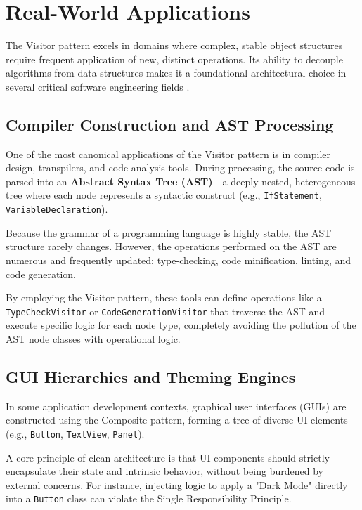 \section{Real-World Applications}
\label{sec:applications}

The Visitor pattern excels in domains where complex, stable object structures require frequent application of new, distinct operations. Its ability to decouple algorithms from data structures makes it a foundational architectural choice in several critical software engineering fields \cite{gof1994}.

\subsection{Compiler Construction and AST Processing}
One of the most canonical applications of the Visitor pattern is in compiler design, transpilers, and code analysis tools. During processing, the source code is parsed into an \textbf{Abstract Syntax Tree (AST)}---a deeply nested, heterogeneous tree where each node represents a syntactic construct (e.g., \texttt{IfStatement}, \texttt{Variable\allowbreak Declaration}). 

Because the grammar of a programming language is highly stable, the AST structure rarely changes. However, the operations performed on the AST are numerous and frequently updated: type-checking, code minification, linting, and code generation. 

By employing the Visitor pattern, these tools can define operations like a \texttt{TypeCheck\allowbreak Visitor} or \texttt{CodeGeneration\allowbreak Visitor} that traverse the AST and execute specific logic for each node type, completely avoiding the pollution of the AST node classes with operational logic.

\subsection{GUI Hierarchies and Theming Engines}
In some application development contexts, graphical user interfaces (GUIs) are constructed using the Composite pattern, forming a tree of diverse UI elements (e.g., \texttt{Button}, \texttt{TextView}, \texttt{Panel}). 

A core principle of clean architecture is that UI components should strictly encapsulate their state and intrinsic behavior, without being burdened by external concerns. For instance, injecting logic to apply a "Dark Mode" directly into a \texttt{Button} class can violate the Single Responsibility Principle.

